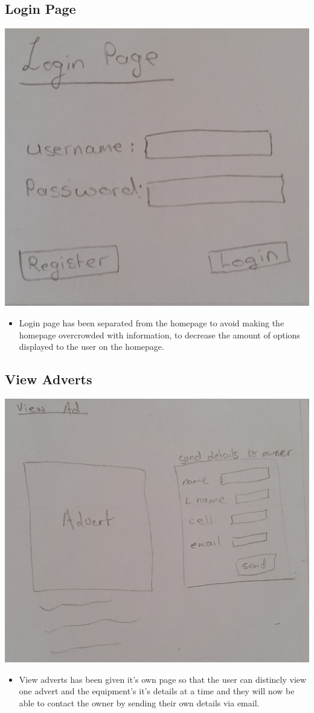 \documentclass[11pt]{article}
\begin{document}
	\subsection{Login Page} 
	\includegraphics[width=\textwidth]{../Images/LoginPage.jpg} \\
	
	\begin{itemize}
		\item Login page has been separated from the homepage to avoid making the homepage overcrowded with information, to decrease the amount of options displayed to the user on the homepage. \newpage
	\end{itemize} 
	
	\subsection{View Adverts}
	\includegraphics[width=\textwidth]{../Images/ViewAdverts.jpg} \\
	
	\begin{itemize}
		\item View adverts has been given it's own page so that the user can distincly view one advert and the equipment's it's details at a time and they will now be able to contact the owner by sending their own details via email. \newpage
	\end{itemize}
	
\end{document}

